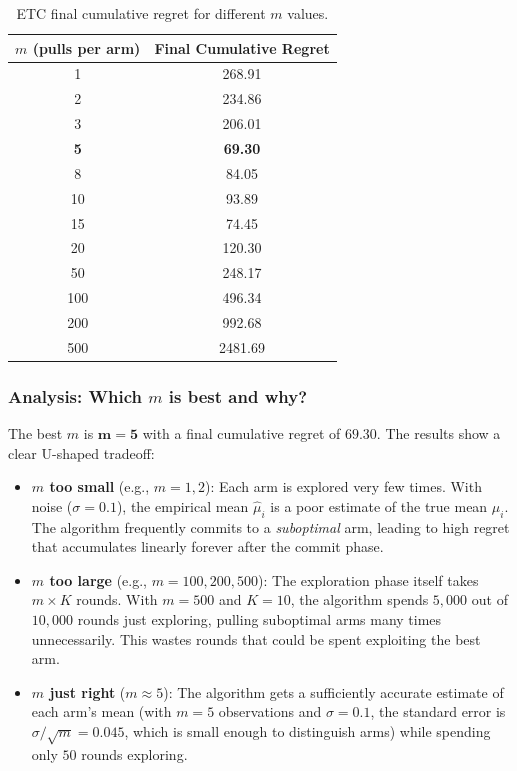 \documentclass[11pt]{article}
\begin{document}
\begin{table}[H]
\centering
\caption{ETC final cumulative regret for different $m$ values.}
\label{tab:etc}
\begin{tabular}{cc}
\toprule
$m$ (pulls per arm) & Final Cumulative Regret \\
\midrule
1   & 268.91 \\
2   & 234.86 \\
3   & 206.01 \\
\textbf{5}   & \textbf{69.30} \\
8   & 84.05 \\
10  & 93.89 \\
15  & 74.45 \\
20  & 120.30 \\
50  & 248.17 \\
100 & 496.34 \\
200 & 992.68 \\
500 & 2481.69 \\
\bottomrule
\end{tabular}
\end{table}

\subsubsection{Analysis: Which $m$ is best and why?}

The best $m$ is $\mathbf{m = 5}$ with a final cumulative regret of $69.30$. The results show a clear U-shaped tradeoff:

\begin{itemize}
    \item \textbf{$m$ too small} (e.g., $m=1, 2$): Each arm is explored very few times. With noise ($\sigma = 0.1$), the empirical mean $\hat{\mu}_i$ is a poor estimate of the true mean $\mu_i$. The algorithm frequently commits to a \textit{suboptimal} arm, leading to high regret that accumulates linearly forever after the commit phase.
    \item \textbf{$m$ too large} (e.g., $m=100, 200, 500$): The exploration phase itself takes $m \times K$ rounds. With $m = 500$ and $K = 10$, the algorithm spends $5{,}000$ out of $10{,}000$ rounds just exploring, pulling suboptimal arms many times unnecessarily. This wastes rounds that could be spent exploiting the best arm.
    \item \textbf{$m$ just right} ($m \approx 5$): The algorithm gets a sufficiently accurate estimate of each arm's mean (with $m=5$ observations and $\sigma=0.1$, the standard error is $\sigma / \sqrt{m} = 0.045$, which is small enough to distinguish arms) while spending only $50$ rounds exploring.
\end{itemize}
\end{document}
